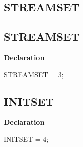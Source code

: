 \documentclass{report}
\newif\ifpdf
\begin{document}
\subsection*{\large{\textbf{STREAMSET}}\normalsize\hspace{1ex}\hrulefill}
\else
\subsection*{STREAMSET}
\fi
\label{ok_vorbisfile-STREAMSET}
\begin{list}{}{
\setlength{\itemindent}{0cm}
\setlength{\listparindent}{0cm}
\setlength{\leftmargin}{\evensidemargin}
\addtolength{\leftmargin}{\tmplength}
\settowidth{\labelsep}{X}
\addtolength{\leftmargin}{\labelsep}
\setlength{\labelwidth}{\tmplength}
}
\item[\textbf{Declaration}\hfill]
\ifpdf
\begin{flushleft}
\fi
\begin{ttfamily}
STREAMSET = 3;\end{ttfamily}

\ifpdf
\end{flushleft}
\fi

\end{list}
\ifpdf
\subsection*{\large{\textbf{INITSET}}\normalsize\hspace{1ex}\hrulefill}
\else
\subsection*{INITSET}
\fi
\label{ok_vorbisfile-INITSET}
\begin{list}{}{
\setlength{\itemindent}{0cm}
\setlength{\listparindent}{0cm}
\setlength{\leftmargin}{\evensidemargin}
\addtolength{\leftmargin}{\tmplength}
\settowidth{\labelsep}{X}
\addtolength{\leftmargin}{\labelsep}
\setlength{\labelwidth}{\tmplength}
}
\item[\textbf{Declaration}\hfill]
\ifpdf
\begin{flushleft}
\fi
\begin{ttfamily}
INITSET   = 4;\end{ttfamily}

\ifpdf
\end{flushleft}
\fi

\end{list}
\end{document}
